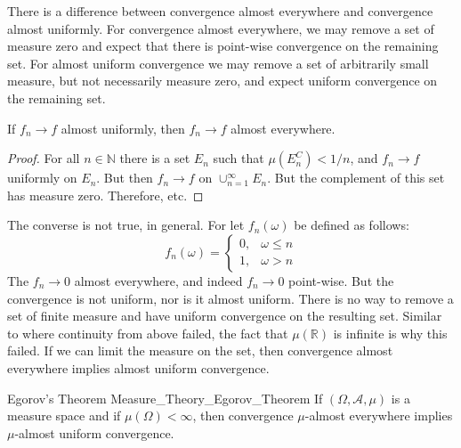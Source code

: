         There is a difference between convergence almost
        everywhere and convergence almost uniformly. For
        convergence almost everywhere, we may remove a set
        of measure zero and expect that there is point-wise
        convergence on the remaining set. For almost uniform
        convergence we may remove a set of arbitrarily small
        measure, but not necessarily measure zero, and expect
        uniform convergence on the remaining set.
        \begin{theorem}
            If $f_{n}\rightarrow{f}$ almost uniformly,
            then $f_{n}\rightarrow{f}$ almost everywhere.
        \end{theorem}
        \begin{proof}
            For all $n\in\mathbb{N}$ there is a set
            $E_{n}$ such that $\mu(E_{n}^{C})<1/n$, and
            $f_{n}\rightarrow{f}$ uniformly on $E_{n}$.
            But then $f_{n}\rightarrow{f}$ on
            $\cup_{n=1}^{\infty}E_{n}$. But the complement
            of this set has measure zero. Therefore, etc.
        \end{proof}
        The converse is not true, in general. For let
        $f_{n}(\omega)$ be defined as follows:
        \begin{equation}
            f_{n}(\omega)=
            \begin{cases}
                0,&\omega\leq{n}\\
                1,&\omega>n
            \end{cases}
        \end{equation}
        The $f_{n}\rightarrow{0}$ almost everywhere, and
        indeed $f_{n}\rightarrow{0}$ point-wise. But
        the convergence is not uniform, nor is it
        almost uniform. There is no way to remove a set of
        finite measure and have uniform convergence on the
        resulting set. Similar to where continuity from above
        failed, the fact that $\mu(\mathbb{R})$ is infinite
        is why this failed. If we can limit the measure on
        the set, then convergence almost everywhere implies
        almost uniform convergence.
        \begin{ftheorem}{Egorov's Theorem}
                        {Measure_Theory_Egorov_Theorem}
            If $(\Omega,\mathcal{A},\mu)$ is a measure
            space and if $\mu(\Omega)<\infty$, then
            convergence $\mu$-almost everywhere implies
            $\mu$-almost uniform convergence.
        \end{ftheorem}
